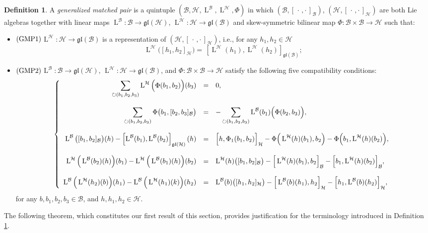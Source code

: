 \documentclass[final,1p,times,nopreprintline]{elsarticle}
\theoremstyle{definition}
\newtheorem{definition}{Definition}[section]
\numberwithin{equation}{section}
\newcommand{\h}{\mathcal{H}}
\newcommand{\lh}{\operatorname{L}^\h}
\newcommand{\lk}{\operatorname{L}^\kl}
\numberwithin{equation}{section}
\newcommand{\gl}{\mathfrak{gl}}
\newcommand{\cro}{[\,\cdot\,,\cdot\,]}
\newcommand{\kl}{\mathcal{B}}
\begin{document}
\begin{definition}\label{DefGMP1}
A \textit{generalized matched pair} is a quintuple $(\kl,\h,\lk,\lh,\Phi)$ in which $(\kl,\cro_\kl)$, $(\h,\cro_\h)$ are both Lie algebras together with linear maps $\operatorname{L}^\kl:\kl\to\gl(\h)$, $\operatorname{L}^\h:\h\to\gl(\kl)$ and skew-symmetric bilinear map $\Phi:\kl\times\kl\to\h$ such that:
\begin{itemize}
\item[]$(\textnormal{GMP}1)$\quad  $\lh:\h\to\gl(\kl)$ is a representation of $(\h,\cro_\h)$, i.e., for any $h_1,h_2\in\h$
\begin{equation*}
\lh\big([h_1,h_2]_\h\big)=\,\left[\lh(h_1),\lh(h_2)\right]_{\gl(\kl)};
\end{equation*}
\item[]$(\textnormal{GMP}2)$\quad  $\lk:\kl\to\gl(\h),\,\lh:\h\to\gl(\kl)$, and $\Phi:\kl\times\kl\to\h$ satisfy the following five compatibility conditions:
\begin{equation*}
	\left\{
	\begin{array}{r c l}
		\displaystyle\sum_{\circlearrowright (b_1,b_2,b_3)}\lh\Big(\Phi(b_1,b_2)\Big)(b_3)&=&0,\\\\ 
		\displaystyle\sum_{\circlearrowright (b_1,b_2,b_3)}\Phi\big(b_1,[b_2,b_3]_\kl\big)&=&-\displaystyle\sum_{\circlearrowright (b_1,b_2,b_3)}\lk(b_1)\Big(\Phi(b_2,b_3)\Big),\hfill\\\\
	 \lk\big([b_1,b_2]_\kl\big)(h)-\left[\lk(b_1),\lk(b_2)\right]_{\gl(\h)}(h)&=&\Big[h,\Phi_1(b_1,b_2)\Big]_\h-\Phi\Big(\lh(h)(b_1),b_2\Big)-\Phi\Big(b_1,\lh(h)(b_2)\Big),\hfill\\\\
	 \lh\Big(\lk(b_2)(h)\Big)(b_1)-\lh\Big(\lk(b_1)(h)\Big)(b_2)&=&\lh(h)\big([b_1,b_2]_\kl\big)-\Big[\lh(h)(b_1),b_2\Big]_\kl-\Big[b_1,\lh(h)(b_2)\Big]_\kl,\hfill\\\\
	 \lk\Big(\lh(h_2)(b)\Big)(h_1)-\lk\Big(\lh(h_1)(k)\Big)(h_2)&=&\lk(b)\big([h_1,h_2]_\h\big)-\Big[\lk(b)(h_1),h_2\Big]_\h-\Big[h_1,\lk(b)(h_2)\Big]_\h,\hfill
	\end{array}
	\right.
\end{equation*}
for any $b,b_1,b_2,b_3\in\kl$, and $h,h_1,h_2\in\h$.
\end{itemize}
\end{definition}

The following theorem, which constitutes our first result of this section, provides justification for the terminology introduced in Definition \ref{DefGMP1}.
\end{document}
